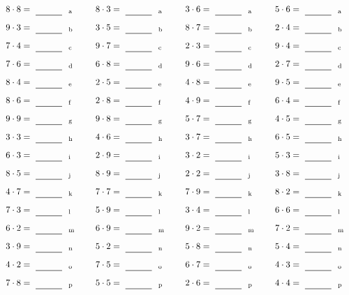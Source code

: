 \documentclass
[
  draft    = true,
  fontsize = 11pt,
  parskip  = half-
]
{scrartcl}
\begin{document}
\par\vfill\par
\begin{align*}
    \pline{8\cdot8}&=\rline{a}
  & \pline{8\cdot3}&=\rline{a}
  & \pline{3\cdot6}&=\rline{a}
  & \pline{5\cdot6}&=\rline{a} \\[1ex]
    \pline{9\cdot3}&=\rline{b}
  & \pline{3\cdot5}&=\rline{b}
  & \pline{8\cdot7}&=\rline{b}
  & \pline{2\cdot4}&=\rline{b} \\[1ex]
    \pline{7\cdot4}&=\rline{c}
  & \pline{9\cdot7}&=\rline{c}
  & \pline{2\cdot3}&=\rline{c}
  & \pline{9\cdot4}&=\rline{c} \\[1ex]
    \pline{7\cdot6}&=\rline{d}
  & \pline{6\cdot8}&=\rline{d}
  & \pline{9\cdot6}&=\rline{d}
  & \pline{2\cdot7}&=\rline{d} \\[1ex]
    \pline{8\cdot4}&=\rline{e}
  & \pline{2\cdot5}&=\rline{e}
  & \pline{4\cdot8}&=\rline{e}
  & \pline{9\cdot5}&=\rline{e} \\[1ex]
    \pline{8\cdot6}&=\rline{f}
  & \pline{2\cdot8}&=\rline{f}
  & \pline{4\cdot9}&=\rline{f}
  & \pline{6\cdot4}&=\rline{f} \\[1ex]
    \pline{9\cdot9}&=\rline{g}
  & \pline{9\cdot8}&=\rline{g}
  & \pline{5\cdot7}&=\rline{g}
  & \pline{4\cdot5}&=\rline{g} \\[1ex]
    \pline{3\cdot3}&=\rline{h}
  & \pline{4\cdot6}&=\rline{h}
  & \pline{3\cdot7}&=\rline{h}
  & \pline{6\cdot5}&=\rline{h} \\[1ex]
    \pline{6\cdot3}&=\rline{i}
  & \pline{2\cdot9}&=\rline{i}
  & \pline{3\cdot2}&=\rline{i}
  & \pline{5\cdot3}&=\rline{i} \\[1ex]
    \pline{8\cdot5}&=\rline{j}
  & \pline{8\cdot9}&=\rline{j}
  & \pline{2\cdot2}&=\rline{j}
  & \pline{3\cdot8}&=\rline{j} \\[1ex]
    \pline{4\cdot7}&=\rline{k}
  & \pline{7\cdot7}&=\rline{k}
  & \pline{7\cdot9}&=\rline{k}
  & \pline{8\cdot2}&=\rline{k} \\[1ex]
    \pline{7\cdot3}&=\rline{l}
  & \pline{5\cdot9}&=\rline{l}
  & \pline{3\cdot4}&=\rline{l}
  & \pline{6\cdot6}&=\rline{l} \\[1ex]
    \pline{6\cdot2}&=\rline{m}
  & \pline{6\cdot9}&=\rline{m}
  & \pline{9\cdot2}&=\rline{m}
  & \pline{7\cdot2}&=\rline{m} \\[1ex]
    \pline{3\cdot9}&=\rline{n}
  & \pline{5\cdot2}&=\rline{n}
  & \pline{5\cdot8}&=\rline{n}
  & \pline{5\cdot4}&=\rline{n} \\[1ex]
    \pline{4\cdot2}&=\rline{o}
  & \pline{7\cdot5}&=\rline{o}
  & \pline{6\cdot7}&=\rline{o}
  & \pline{4\cdot3}&=\rline{o} \\[1ex]
    \pline{7\cdot8}&=\rline{p}
  & \pline{5\cdot5}&=\rline{p}
  & \pline{2\cdot6}&=\rline{p}
  & \pline{4\cdot4}&=\rline{p}
\end{align*}
\end{document}
